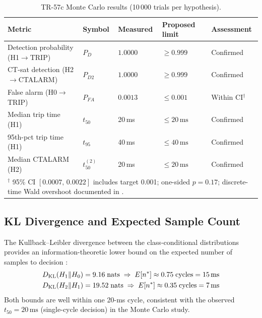 \documentclass[11pt, a4paper]{article}
\newcommand{\ms}{\,\text{ms}}
\begin{document}
\begin{table}[htbp]
  \centering
  \caption{TR-57c Monte Carlo results (10\,000 trials per hypothesis).}
  \label{tab:mc_results}
  \begin{tabular}{lllll}
    \toprule
    \textbf{Metric} & \textbf{Symbol} & \textbf{Measured}
      & \textbf{Proposed limit} & \textbf{Assessment} \\
    \midrule
    Detection probability (H1$\to$TRIP)
      & $P_D$ & $1.0000$ & $\geq 0.999$ & Confirmed \\
    CT-sat detection (H2$\to$CTALARM)
      & $P_{D2}$ & $1.0000$ & $\geq 0.999$ & Confirmed \\
    False alarm (H0$\to$TRIP)
      & $P_{FA}$ & $0.0013$ & $\leq 0.001$ & Within CI$^\dagger$ \\
    Median trip time (H1)
      & $t_{50}$ & 20\,ms & $\leq 20\ms$ & Confirmed \\
    95th-pct trip time (H1)
      & $t_{95}$ & 40\,ms & $\leq 40\ms$ & Confirmed \\
    Median CTALARM (H2)
      & $t^{(2)}_{50}$ & 20\,ms & $\leq 20\ms$ & Confirmed \\
    \bottomrule
    \multicolumn{5}{l}{\footnotesize
      $^\dagger$ 95\% CI $[0.0007,\,0.0022]$ includes target 0.001;
      one-sided $p=0.17$; discrete-time Wald overshoot documented in
      \cite{Wald1945}.}
  \end{tabular}
\end{table}

\subsection{KL Divergence and Expected Sample Count}

The Kullback--Leibler divergence between the class-conditional distributions
provides an information-theoretic lower bound on the expected number of
samples to decision \cite{Cover2006}:
\begin{align}
  D_{\rm KL}(H_1 \| H_0) &= 9.16\;\text{nats}
    \;\Rightarrow\; E[n^*] \approx 0.75\;\text{cycles} = 15\ms \\
  D_{\rm KL}(H_2 \| H_1) &= 19.52\;\text{nats}
    \;\Rightarrow\; E[n^*] \approx 0.35\;\text{cycles} = 7\ms
\end{align}
Both bounds are well within one 20-ms cycle, consistent with the
observed $t_{50} = 20\ms$ (single-cycle decision) in the Monte Carlo study.

\end{document}
